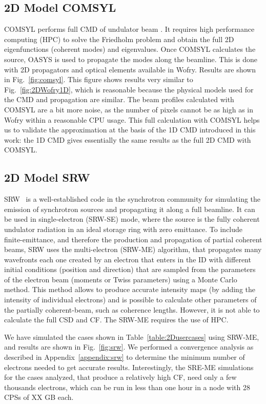 \documentclass{iucr}              %
\newcommand{\inred}[1]{{\color{red}#1}}
\begin{document}
\subsection{2D Model COMSYL}
COMSYL performs full CMD of undulator beam \cite{glass2017}. It requires high performance computing (HPC) to solve the Friedholm problem and obtain the full 2D eigenfunctions (coherent modes) and eigenvalues. Once COMSYL calculates the source, OASYS is used to propagate the modes along the beamline. This is done with 2D propagators and optical elements available in Wofry. Results are shown in Fig.~\ref{fig:comsyl}. This figure shows results very similar to Fig.~\ref{fig:2DWofry1D}, which is reasonable because the physical models used for the CMD and propagation are similar. The beam profiles calculated with COMSYL are a bit more noise, as the number of pixels cannot be as high as in Wofry within a reasonable CPU usage. This full calculation with COMSYL helps us to validate the approximation at the basis of the 1D CMD introduced in this work: the 1D CMD gives essentially the same results as the full 2D CMD with COMSYL.   

\subsection{2D Model SRW}
SRW~\cite{codeSRW} is a well-established code in the synchrotron community for simulating the emission of synchrotron sources and propagating it along a full beamline. It can be used in single-electron (SRW-SE) mode, where the source is the fully coherent undulator radiation in an ideal storage ring with zero emittance. To include finite-emittance, and therefore the production and propagation of partial coherent beams, SRW uses the multi-electron (SRW-ME) algorithm, that propagates many wavefronts each one created by an electron that enters in the ID with different initial conditions (position and direction) that are sampled from the parameters of the electron beam (moments or Twiss parameters) using a Monte Carlo method. This method allows to produce accurate intensity maps (by adding the intensity of individual electrons) and is possible to calculate other parameters of the partially coherent-beam, such as coherence lengths. However, it is not able to calculate the full CSD and CF. The SRW-ME requires the use of HPC. 

We have simulated the cases shown in Table~\ref{table:2Dusercases} using SRW-ME, and results are shown in Fig.~\ref{fig:srw}. We performed a convergence analysis as described in Appendix~\ref{appendix:srw} to determine the minimum number of electrons needed to get accurate results. Interestingly, the SRE-ME simulations for the cases analyzed, that produce a relatively high CF, need only a few thousands electrons, which can be run in less than one hour in a node with 28 CPSs \inred{of XX GB each}.
\end{document}
